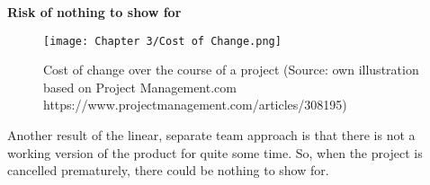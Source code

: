 \textbf{Risk of nothing to show for} \\
\begin{figure}[H]
      \centering
      \texttt{[image: Chapter 3/Cost of Change.png]}
      \caption{Cost of change over the course of a project (Source: own illustration based on Project Management.com https://www.projectmanagement.com/articles/308195)}
\end{figure}
Another result of the linear, separate team approach is that there is not a working version of the
product for quite some time. So, when the project is cancelled prematurely, there could be nothing
to show for.\\
